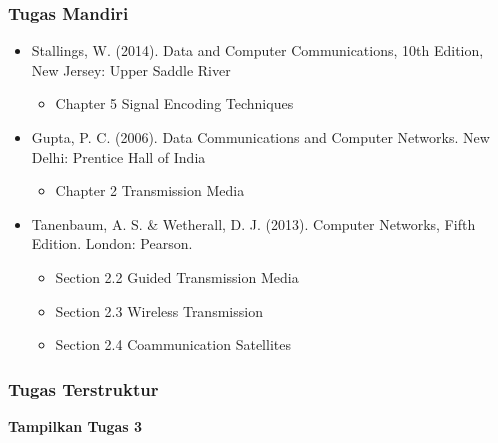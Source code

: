 \documentclass[pdflatex,compress]{beamer}
\begin{document}

\begin{frame}
	\frametitle{Tugas Mandiri}
	\begin{itemize}
		\item Stallings, W. (2014). Data and Computer Communications, 10th Edition, New Jersey: Upper Saddle River\\
		\begin{itemize}
			\item Chapter 5 Signal Encoding Techniques
		\end{itemize}
		\item Gupta, P. C. (2006). Data Communications and Computer Networks. New Delhi: Prentice Hall of India\\
		\begin{itemize}
			\item Chapter 2 Transmission Media
		\end{itemize}
		\item Tanenbaum, A. S. \& Wetherall, D. J. (2013). Computer Networks, Fifth Edition. London: Pearson.\\
		\begin{itemize}
			\item Section 2.2 Guided Transmission Media
			\item Section 2.3 Wireless Transmission
			\item Section 2.4 Coammunication Satellites
		\end{itemize}
	\end{itemize}
\end{frame}

\begin{frame}
	\frametitle{Tugas Terstruktur}
	\textbf{Tampilkan Tugas 3}
\end{frame}
\end{document}
